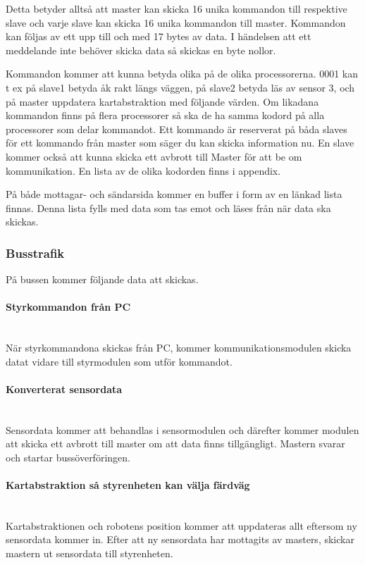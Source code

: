 \documentclass[a4paper,12pt,fleqn]{article}
\begin{document}
		Detta betyder alltså att master kan skicka 16 unika kommandon till respektive slave och varje slave kan skicka 16 unika kommandon till master. Kommandon kan följas av ett upp till och med 17 bytes av data. I händelsen att ett meddelande inte behöver skicka data så skickas en byte nollor.


		Kommandon kommer att kunna betyda olika på de olika processorerna. 0001 kan t ex på slave1 betyda åk rakt längs väggen, på slave2 betyda läs av sensor 3, och på master uppdatera kartabstraktion med följande värden. Om likadana kommandon finns på flera processorer så ska de ha samma kodord på alla processorer som delar kommandot. Ett kommando är reserverat på båda slaves för ett kommando från master som säger du kan skicka information nu. En slave kommer också att kunna skicka ett avbrott till Master för att be om kommunikation. En lista av de olika kodorden finns i appendix. 
		
På både mottagar- och sändarsida kommer en buffer i form av en länkad lista finnas. Denna lista fylls med data som tas emot och läses från när data ska skickas. 


\subsubsection{Busstrafik}
På bussen kommer följande data att skickas.
\paragraph{Styrkommandon från PC}
~\\
När styrkommandona skickas från PC, kommer kommunikationsmodulen skicka datat vidare till styrmodulen som utför kommandot.
\paragraph{Konverterat sensordata}
~\\
Sensordata kommer att behandlas i sensormodulen och därefter kommer modulen att skicka ett avbrott till master om att data finns tillgängligt. Mastern svarar och startar bussöverföringen.
\paragraph{Kartabstraktion så styrenheten kan välja färdväg}
~\\
Kartabstraktionen och robotens position kommer att uppdateras allt eftersom ny sensordata kommer in. Efter att ny sensordata har  mottagits av masters, skickar mastern ut sensordata till styrenheten.
\end{document}
